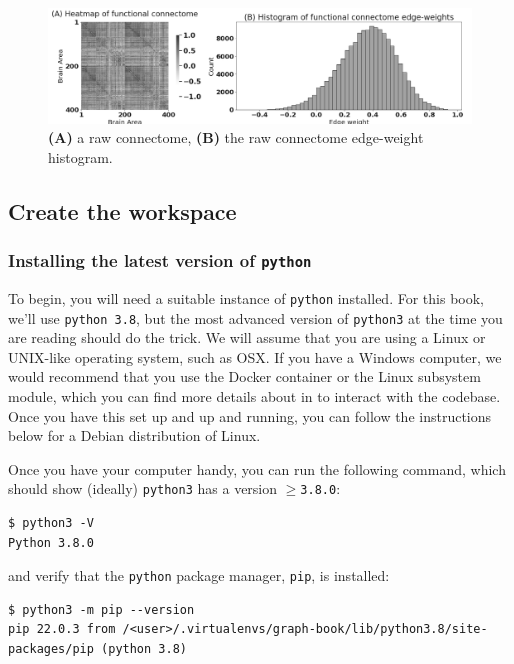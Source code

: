 \begin{figure}[h]
    \centering
    \includegraphics[width=\linewidth]{foundations/ch2/Images/raw.png}
    \caption[Visualizing connectome data]{\textbf{(A)} a raw connectome, \textbf{(B)} the raw connectome edge-weight histogram.}
    \label{fig:ch2:raw}
\end{figure}

\subsection{Create the workspace}
\label{sec:ch2:get:install}
\subsubsection{Installing the latest version of \texttt{python}}

To begin, you will need a suitable instance of \texttt{python} installed. For this book, we'll use \texttt{python 3.8}, but the most advanced version of \texttt{python3} at the time you are reading should do the trick. We will assume that you are using a Linux or UNIX-like operating system, such as OSX. If you have a Windows computer, we would recommend that you use the Docker container or the Linux subsystem module, which you can find more details about in \cite{windowsss} to interact with the codebase. Once you have this set up and up and running, you can follow the instructions below for a Debian distribution of Linux.

Once you have your computer handy, you can run the following command, which should show (ideally) \texttt{python3} has a version $\geq$\texttt{3.8.0}:

\begin{lstlisting}[style=bash]
$ python3 -V
Python 3.8.0
\end{lstlisting}

and verify that the \texttt{python} package manager, \texttt{pip}, is installed:

\begin{lstlisting}[style=bash]
$ python3 -m pip --version
pip 22.0.3 from /<user>/.virtualenvs/graph-book/lib/python3.8/site-packages/pip (python 3.8)
\end{lstlisting}

